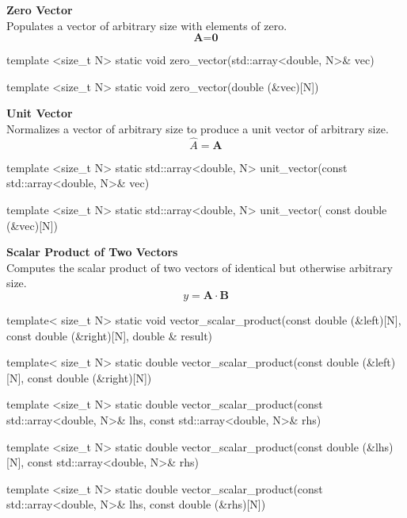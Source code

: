 \documentclass[11pt,fleqn]{report}
\begin{document}
\textbf{Zero Vector}\\
Populates a vector of arbitrary size with elements of zero.
\begin{equation*}
\textbf{A} = \textbf{0}
\end{equation*}
\begin{code}
template <size_t N>
static void zero_vector(std::array<double, N>& vec)

template <size_t N>
static void zero_vector(double (&vec)[N])
\end{code}

\textbf{Unit Vector}\\
Normalizes a vector of arbitrary size to produce a unit vector of arbitrary size.
\begin{equation*}
\hat{A} = \textbf{A}
\end{equation*}
\begin{code}
template <size_t N>
static std::array<double, N> unit_vector(const std::array<double, N>& vec)

template <size_t N>
static std::array<double, N> unit_vector( const double (&vec)[N])
\end{code}

\textbf{Scalar Product of Two Vectors}\\
Computes the scalar product of two vectors of identical but otherwise
arbitrary size.
\begin{equation*}
y = \textbf{A} \cdot \textbf{B}
\end{equation*}
\begin{code}
template< size_t N>
static void vector_scalar_product(const double (&left)[N],
                                  const double (&right)[N],
                                  double & result)

template< size_t N>
static double vector_scalar_product(const double (&left)[N],
                                    const double (&right)[N])

template <size_t N>
static double vector_scalar_product(const std::array<double, N>& lhs,
                                    const std::array<double, N>& rhs) 

template <size_t N>
static double vector_scalar_product(const double (&lhs)[N],
                                    const std::array<double, N>& rhs)

template <size_t N>
static double vector_scalar_product(const std::array<double, N>& lhs,
                                    const double (&rhs)[N]) 
\end{code}
\end{document}
